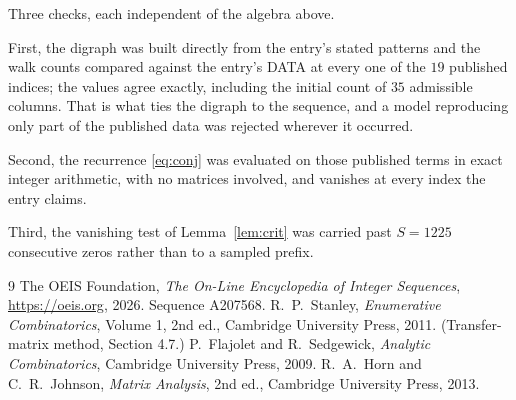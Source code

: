 \documentclass[11pt,a4paper]{article}
\theoremstyle{plain}
\theoremstyle{definition}
\begin{document}
Three checks, each independent of the algebra above.

First, the digraph was built directly from the entry's stated patterns and the walk counts
compared against the entry's DATA at every one of the $19$ published indices; the
values agree exactly, including the initial count of $35$ admissible columns. That is
what ties the digraph to the sequence, and a model reproducing only part of the published
data was rejected wherever it occurred.

Second, the recurrence \eqref{eq:conj} was evaluated on those published terms in exact
integer arithmetic, with no matrices involved, and vanishes at every index the entry claims.

Third, the vanishing test of Lemma~\ref{lem:crit} was carried past $S=1225$ consecutive
zeros rather than to a sampled prefix.

\begin{thebibliography}{9}
 The OEIS Foundation, \emph{The On-Line Encyclopedia of Integer
Sequences}, \url{https://oeis.org}, 2026. Sequence A207568.
 R.~P.~Stanley, \emph{Enumerative Combinatorics}, Volume 1, 2nd ed.,
Cambridge University Press, 2011. (Transfer-matrix method, Section 4.7.)
 P.~Flajolet and R.~Sedgewick, \emph{Analytic Combinatorics}, Cambridge
University Press, 2009.
 R.~A.~Horn and C.~R.~Johnson, \emph{Matrix Analysis}, 2nd ed., Cambridge
University Press, 2013.
\end{thebibliography}
\end{document}
